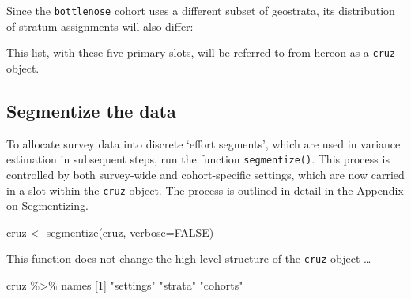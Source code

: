 \documentclass[
]{book}
\newenvironment{Shaded}{\begin{snugshade}}{\end{snugshade}}
\newcommand{\AttributeTok}[1]{\textcolor[rgb]{0.77,0.63,0.00}{#1}}
\newcommand{\ConstantTok}[1]{\textcolor[rgb]{0.00,0.00,0.00}{#1}}
\newcommand{\DecValTok}[1]{\textcolor[rgb]{0.00,0.00,0.81}{#1}}
\newcommand{\FunctionTok}[1]{\textcolor[rgb]{0.00,0.00,0.00}{#1}}
\newcommand{\NormalTok}[1]{#1}
\newcommand{\OtherTok}[1]{\textcolor[rgb]{0.56,0.35,0.01}{#1}}
\newcommand{\SpecialCharTok}[1]{\textcolor[rgb]{0.00,0.00,0.00}{#1}}
\newcommand{\StringTok}[1]{\textcolor[rgb]{0.31,0.60,0.02}{#1}}
\begin{document}
Since the \texttt{bottlenose} cohort uses a different subset of geostrata, its distribution of stratum assignments will also differ:

\begin{Shaded}
\end{Shaded}

This list, with these five primary slots, will be referred to from hereon as a \texttt{cruz} object.

\hypertarget{segmentize-the-data}{%
\subsection*{Segmentize the data}\label{segmentize-the-data}}

To allocate survey data into discrete `effort segments', which are used in variance estimation in subsequent steps, run the function \texttt{segmentize()}. This process is controlled by both survey-wide and cohort-specific \protect\hypertarget{settings}{}{settings}, which are now carried in a slot within the \texttt{cruz} object. The process is outlined in detail in the \protect\hyperlink{segmentizing}{Appendix on Segmentizing}.

\begin{Shaded}
\begin{Highlighting}[]
\NormalTok{cruz }\OtherTok{\textless{}{-}} \FunctionTok{segmentize}\NormalTok{(cruz, }\AttributeTok{verbose=}\ConstantTok{FALSE}\NormalTok{)}
\end{Highlighting}
\end{Shaded}

This function does not change the high-level structure of the \texttt{cruz} object \ldots{}

\begin{Shaded}
\begin{Highlighting}[]
\NormalTok{cruz }\SpecialCharTok{\%\textgreater{}\%}\NormalTok{ names}
\NormalTok{[}\DecValTok{1}\NormalTok{] }\StringTok{"settings"} \StringTok{"strata"}   \StringTok{"cohorts"} 
\end{Highlighting}
\end{Shaded}
\end{document}
